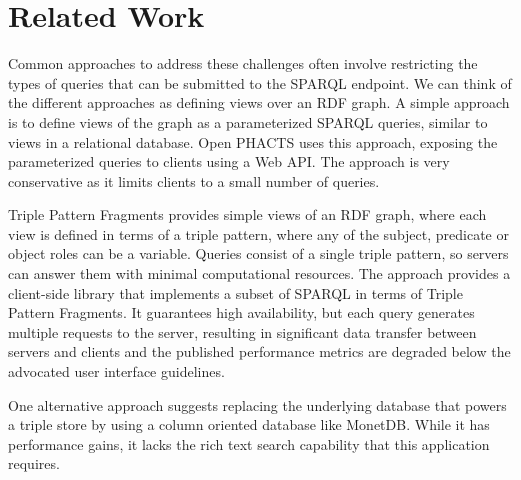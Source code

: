 \vspace{-0.2cm}
\section{Related Work}
\label{sec:related-work}
Common approaches to address these challenges often involve restricting the types of queries that can be submitted to the SPARQL endpoint.
We can think of the different approaches as defining views over an RDF graph.
A simple approach is to define views of the graph as a parameterized SPARQL queries, similar to views in a relational database.
Open PHACTS\cite{Loizou_Angles_Groth_2014} uses this approach, exposing the parameterized queries to clients using a Web API.
The approach is very conservative as it limits clients to a small number of queries.

Triple Pattern Fragments \cite{Verborgh2014} provides simple views of an RDF graph, where each view is defined in terms of a triple pattern, where any of the subject, predicate or object roles can be a variable.
Queries consist of a single triple pattern, so servers can answer them with minimal computational resources.
The approach provides a client-side library that implements a subset of SPARQL in terms of Triple Pattern Fragments.
It guarantees high availability, but each query generates multiple requests to the server, resulting in significant data transfer between servers and clients and the published performance metrics are degraded below the advocated user interface guidelines. 

One alternative approach suggests replacing the underlying database that powers a triple store by using a column oriented database like MonetDB\cite{Wang_Wang_Du_Feng_2010}.   While it has performance gains, it lacks the rich text search capability that this application requires.